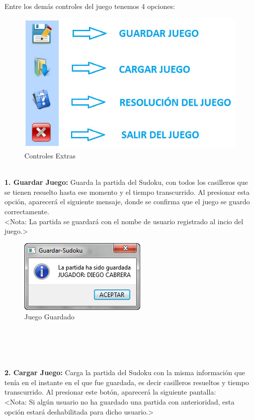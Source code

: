 \ \\ \ \\ \ \\ \ \\ \ \\
Entre los demás controles del juego tenemos 4 opciones:

\begin{figure}[htbp]
\begin{center}
\includegraphics[width=.60\textwidth]{./imagenes/Controles2.png}
\caption{Controles Extras}
\label{Controles Extras}
\end{center}
\end{figure} 

\ \\ \textbf{1. Guardar Juego:} Guarda la partida del Sudoku, con todos los casilleros que se tienen resuelto hasta ese momento y el tiempo transcurrido. Al presionar esta opción, aparecerá el siguiente mensaje, donde se confirma que el juego se guardo correctamente. \\
<Nota: La partida se guardará con el nombe de usuario registrado al incio del juego.>
  
\begin{figure}[htbp]
\begin{center}
\includegraphics[width=.40\textwidth]{./imagenes/Guardar.png}
\caption{Juego Guardado}
\label{Juego Guardado}
\end{center}
\end{figure} 

\ \\ \ \\ \ \ \\ \ \\ 
\textbf{2. Cargar Juego:} Carga la partida del Sudoku con la misma información que tenía en el instante en el que fue guardada, es decir casilleros resueltos y tiempo transcurrido. Al presionar este botón, aparecerá la siguiente pantalla: \\ 
<Nota: Si algún usuario no ha guardado una partida con anterioridad, esta opción estará deshabilitada para dicho usuario.>

